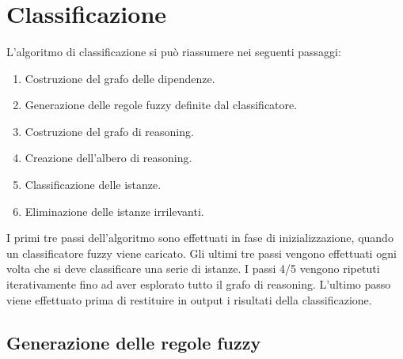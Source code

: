 \begin{tiny}
\begin{bnf*}
		{ \bnfsp {} \bnfsp {} \bnfsp {} \bnfsp {} \bnfsp \bnfts{(} \bnfsp {} \bnfsp \bnfts{,} \bnfsp {} \bnfsp \bnfts{)}} \\
		{ \bnfsp {} \bnfsp {} \bnfsp {} \bnfsp \bnfts{(} \bnfsp {} \bnfsp \bnfts{,} \bnfsp {} \bnfsp \bnfts{)}} \\
		{ \bnfsp {}
		\bnfor \bnfes} \\
		{ \bnfsp {}
		\bnfor \bnfes} \\
		{
		\bnfor {}} \\
	\end{bnf*}
\end{tiny}



\section{Classificazione}

L'algoritmo di classificazione si può riassumere nei seguenti passaggi:

\begin{enumerate} 
 \item Costruzione del grafo delle dipendenze.
 \item Generazione delle regole fuzzy definite dal classificatore.
 \item Costruzione del grafo di reasoning.
 \item Creazione dell'albero di reasoning.
 \item Classificazione delle istanze.
 \item Eliminazione delle istanze irrilevanti.
\end{enumerate}

I primi tre passi dell'algoritmo sono effettuati in fase di inizializzazione, quando un classificatore fuzzy viene caricato.
Gli ultimi tre passi vengono effettuati ogni volta che si deve classificare una serie di istanze.
I passi 4/5 vengono ripetuti iterativamente fino ad aver esplorato tutto il grafo di reasoning.
L'ultimo passo viene effettuato prima di restituire in output i risultati della classificazione.

\subsection{Generazione delle regole fuzzy}

